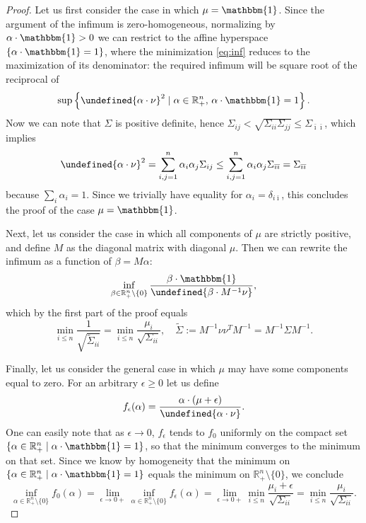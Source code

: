 \documentclass[11pt]{article}
\let\norm\undefined %
\DeclarePairedDelimiter\norm{\lVert}{\rVert}
\begin{document}
\begin{proof}
	Let us first consider the case in which $\mu = \mathbbm{1}$. Since the argument of the infimum is zero-homogeneous, normalizing by $\alpha \cdot \mathbbm{1} > 0$ we can restrict to the affine hyperspace $\{\alpha \cdot \mathbbm{1} = 1\}$, where the minimization \eqref{eq:inf} reduces to the maximization of its denominator: the required infimum will be square root of the reciprocal of
	\[
	\sup\left\{\norm{\alpha \cdot \nu}^2 \mid \alpha \in \mathbb{R}_{+}^n,\, \alpha \cdot \mathbbm{1} = 1\right\}.
	\]
	Now we can note that $\Sigma$ is positive definite, hence $\Sigma_{ij} < \sqrt{\Sigma_{ii}\Sigma_{jj}} \leq \Sigma_{\bar{\imath}\bar{\imath}}$, which implies
	\[
	\norm{\alpha \cdot \nu}^2 = \sum_{i,j=1}^{n} \alpha_i \alpha_j \Sigma_{ij} \leq \sum_{i,j=1}^{n} \alpha_i \alpha_j \Sigma_{\bar{\imath}\bar{\imath}} = \Sigma_{\bar{\imath}\bar{\imath}}
	\]
	because $\sum_i \alpha_i = 1$. Since we trivially have equality for $\alpha_i = \delta_{i\bar{\imath}}$, this concludes the proof of the case $\mu = \mathbbm{1}$.
	
	Next, let us consider the case in which all components of $\mu$ are strictly positive, and define $M$ as the diagonal matrix with diagonal $\mu$. Then we can rewrite the infimum as a function of $\beta = M\alpha$:
	\[
	\inf_{\beta \in \mathbb{R}_{+}^n \setminus \{0\}} \frac{\beta \cdot \mathbbm{1}}{\norm{\beta \cdot M^{-1}\nu}},
	\]
	which by the first part of the proof equals 
	\[
	\min_{i \leq n} \frac{1}{\sqrt{\tilde{\Sigma}_{ii}}} = \min_{i \leq n} \frac{\mu_i}{\sqrt{\Sigma_{ii}}}, \quad \tilde{\Sigma} := M^{-1}\nu\nu^{T} M^{-1} = M^{-1}\Sigma M^{-1}.
	\]
	
	Finally, let us consider the general case in which $\mu$ may have some components equal to zero. For an arbitrary $\epsilon \geq 0$ let us define
	\[
	f_{\epsilon}(\alpha) = \frac{\alpha \cdot (\mu+\epsilon)}{\norm{\alpha \cdot \nu}}.
	\]
	One can easily note that as $\epsilon \to 0$, $f_{\epsilon}$ tends to $f_{0}$ uniformly on the compact set $\{\alpha \in \mathbb{R}^n_+ \mid \alpha \cdot \mathbbm{1} = 1\}$, so that the minimum converges to the minimum on that set. Since we know by homogeneity that the minimum on $\{\alpha \in \mathbb{R}^n_+ \mid \alpha \cdot \mathbbm{1} = 1\}$ equals the minimum on $\mathbb{R}^n_+ \setminus \{0\}$, we conclude
	\[
	\inf_{\alpha \in \mathbb{R}_{+}^n \setminus \{0\}} f_0(\alpha) = 
	\lim_{\epsilon \to 0+} \inf_{\alpha \in \mathbb{R}_{+}^n \setminus \{0\}} f_{\epsilon}(\alpha) = 
	\lim_{\epsilon \to 0+} \min_{i\leq n} \frac{\mu_i+\epsilon}{\sqrt{\Sigma_{ii}}} =
	\min_{i\leq n} \frac{\mu_i}{\sqrt{\Sigma_{ii}}}.
	\]
\end{proof}
\end{document}
